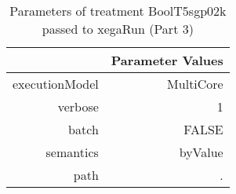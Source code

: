 \begin{table}[ht]
\centering
\begin{tabular}{rr}
  \hline
 & Parameter Values \\ 
  \hline
executionModel & MultiCore \\ 
  verbose & 1 \\ 
  batch & FALSE \\ 
  semantics & byValue \\ 
  path & . \\ 
   \hline
\end{tabular}
\caption{ Parameters of treatment BoolT5sgp02k passed to xegaRun
 (Part 3)} 
\end{table}
